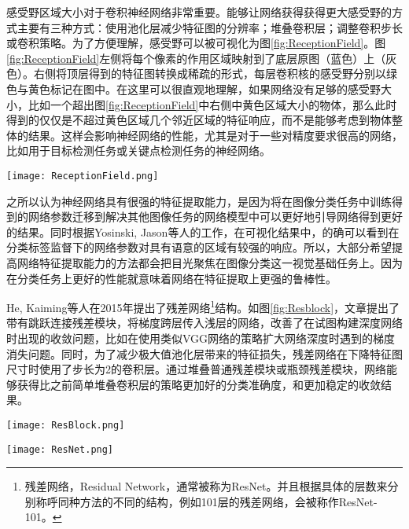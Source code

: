 感受野区域大小对于卷积神经网络非常重要。能够让网络获得获得更大感受野的方式主要有三种方式：使用池化层减少特征图的分辨率；堆叠卷积层；调整卷积步长或卷积策略。为了方便理解，感受野可以被可视化为图\ref{fig:ReceptionField}。图\ref{fig:ReceptionField}左侧将每个像素的作用区域映射到了底层原图（蓝色）上（灰色）。右侧将顶层得到的特征图转换成稀疏的形式，每层卷积核的感受野分别以绿色与黄色标记在图中。在这里可以很直观地理解，如果网络没有足够的感受野大小，比如一个超出图\ref{fig:ReceptionField}中右侧中黄色区域大小的物体，那么此时得到的仅仅是不超过黄色区域几个邻近区域的特征响应，而不是能够考虑到物体整体的结果。这样会影响神经网络的性能，尤其是对于一些对精度要求很高的网络，比如用于目标检测任务或关键点检测任务的神经网络。

\begin{figure*}[htbp]	
	\centering
	\texttt{[image: ReceptionField.png]}
	\caption{两种可视化感受野的方法\cite{fang2017reception}}
	\label{fig:ReceptionField}
\end{figure*}

之所以认为神经网络具有很强的特征提取能力，是因为将在图像分类任务中训练得到的网络参数迁移到解决其他图像任务的网络模型中可以更好地引导网络得到更好的结果\cite{mishkin2015all}。同时根据Yosinski, Jason等人的工作\cite{yosinski2015understanding}，在可视化结果中，的确可以看到在分类标签监督下的网络参数对具有语意的区域有较强的响应。所以，大部分希望提高网络特征提取能力的方法都会把目光聚焦在图像分类这一视觉基础任务上。因为在分类任务上更好的性能就意味着网络在特征提取上更强的鲁棒性。

He, Kaiming等人在2015年提出了残差网络\footnote{残差网络，Residual Network，通常被称为ResNet。并且根据具体的层数来分别称呼同种方法的不同的结构，例如101层的残差网络，会被称作ResNet-101。}结构\cite{He2015Deep}。如图\ref{fig:Resblock}，文章提出了带有跳跃连接残差模块，将梯度跨层传入浅层的网络，改善了在试图构建深度网络时出现的收敛问题，比如在使用类似VGG网络\cite{simonyan2014very}的策略扩大网络深度时遇到的梯度消失问题。同时，为了减少极大值池化层带来的特征损失，残差网络在下降特征图尺寸时使用了步长为2的卷积层。通过堆叠普通残差模块或瓶颈残差模块，网络能够获得比之前简单堆叠卷积层的策略更加好的分类准确度，和更加稳定的收敛结果。

\begin{figure*}[htbp]	
	\centering
	\texttt{[image: ResBlock.png]}
	\caption{残差模块结构：左图为普通残差模块，右图为瓶颈残差模块}
	\label{fig:Resblock}
\end{figure*}
\begin{figure*}[htbp]	
	\centering
	\texttt{[image: ResNet.png]}
	\caption{残差网络结构策略}
	\label{fig:ResNet}
\end{figure*}


